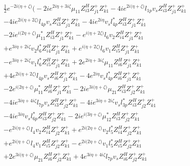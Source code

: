 \begin{align} 
 &\frac{1}{2} e^{-2 i \Big(\eta +\zeta \Big)} \Big(-2 i e^{2 i \eta +3 i \zeta } \mu_{11} Z_{{i 3}}^{H} Z_{{j 1}}^{+} Z_{{k 1}}^{+} -4 i e^{2 i \Big(\eta +\zeta \Big)} l_{1p} v_s Z_{{i 3}}^{H} Z_{{j 1}}^{+} Z_{{k 1}}^{+} \nonumber \\ 
 &-4 i e^{2 i \Big(\eta +2 \zeta \Big)} l_{4p} v_s Z_{{i 3}}^{H} Z_{{j 1}}^{+} Z_{{k 1}}^{+} -4 i e^{2 i \eta } v_s l_{4p}^* Z_{{i 3}}^{H} Z_{{j 1}}^{+} Z_{{k 1}}^{+} \nonumber \\ 
 &-2 i e^{i \Big(2 \eta +\zeta \Big)} \mu_{11}^* Z_{{i 3}}^{H} Z_{{j 1}}^{+} Z_{{k 1}}^{+} - e^{i \Big(\eta +2 \zeta \Big)} l_6 v_2 Z_{{i 4}}^{H} Z_{{j 1}}^{+} Z_{{k 1}}^{+} \nonumber \\ 
 &+e^{3 i \eta +2 i \zeta } v_2 l_6^* Z_{{i 4}}^{H} Z_{{j 1}}^{+} Z_{{k 1}}^{+} +e^{i \Big(\eta +2 \zeta \Big)} l_6 v_1 Z_{{i 5}}^{H} Z_{{j 1}}^{+} Z_{{k 1}}^{+} \nonumber \\ 
 &- e^{3 i \eta +2 i \zeta } v_1 l_6^* Z_{{i 5}}^{H} Z_{{j 1}}^{+} Z_{{k 1}}^{+} +2 e^{2 i \eta +3 i \zeta } \mu_{11} Z_{{i 6}}^{H} Z_{{j 1}}^{+} Z_{{k 1}}^{+} \nonumber \\ 
 &+4 e^{2 i \Big(\eta +2 \zeta \Big)} l_{4p} v_s Z_{{i 6}}^{H} Z_{{j 1}}^{+} Z_{{k 1}}^{+} -4 e^{2 i \eta } v_s l_{4p}^* Z_{{i 6}}^{H} Z_{{j 1}}^{+} Z_{{k 1}}^{+} \nonumber \\ 
 &-2 e^{i \Big(2 \eta +\zeta \Big)} \mu_{11}^* Z_{{i 6}}^{H} Z_{{j 1}}^{+} Z_{{k 1}}^{+} -2 i e^{3 i \Big(\eta +\zeta \Big)} \mu_{21} Z_{{i 3}}^{H} Z_{{j 2}}^{+} Z_{{k 1}}^{+} \nonumber \\ 
 &-4 i e^{3 i \eta +4 i \zeta } l_{7p} v_s Z_{{i 3}}^{H} Z_{{j 2}}^{+} Z_{{k 1}}^{+} -4 i e^{3 i \eta +2 i \zeta } v_s l_{3p}^* Z_{{i 3}}^{H} Z_{{j 2}}^{+} Z_{{k 1}}^{+} \nonumber \\ 
 &-4 i e^{3 i \eta } v_s l_{6p}^* Z_{{i 3}}^{H} Z_{{j 2}}^{+} Z_{{k 1}}^{+} -2 i e^{i \Big(3 \eta +\zeta \Big)} \mu_{12}^* Z_{{i 3}}^{H} Z_{{j 2}}^{+} Z_{{k 1}}^{+} \nonumber \\ 
 &- e^{2 i \Big(\eta +\zeta \Big)} l_4 v_2 Z_{{i 4}}^{H} Z_{{j 2}}^{+} Z_{{k 1}}^{+} +e^{2 i \Big(2 \eta +\zeta \Big)} v_2 l_5^* Z_{{i 4}}^{H} Z_{{j 2}}^{+} Z_{{k 1}}^{+} \nonumber \\ 
 &+e^{2 i \Big(\eta +\zeta \Big)} l_4 v_1 Z_{{i 5}}^{H} Z_{{j 2}}^{+} Z_{{k 1}}^{+} - e^{2 i \Big(2 \eta +\zeta \Big)} v_1 l_5^* Z_{{i 5}}^{H} Z_{{j 2}}^{+} Z_{{k 1}}^{+} \nonumber \\ 
 &+2 e^{3 i \Big(\eta +\zeta \Big)} \mu_{21} Z_{{i 6}}^{H} Z_{{j 2}}^{+} Z_{{k 1}}^{+} +4 e^{3 i \eta +4 i \zeta } l_{7p} v_s Z_{{i 6}}^{H} Z_{{j 2}}^{+} Z_{{k 1}}^{+} \nonumber \\ 

\end{align}
